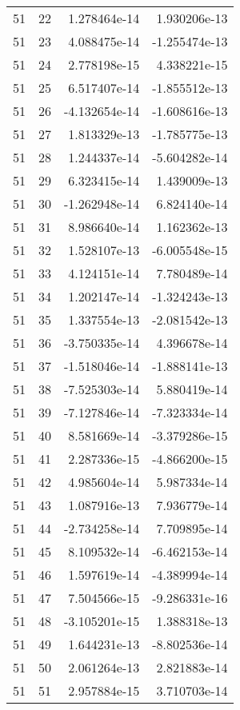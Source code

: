 \begin{tabular}{rrrr}
  51 &   22 &  1.278464e-14 &  1.930206e-13 \\
  51 &   23 &  4.088475e-14 & -1.255474e-13 \\
  51 &   24 &  2.778198e-15 &  4.338221e-15 \\
  51 &   25 &  6.517407e-14 & -1.855512e-13 \\
  51 &   26 & -4.132654e-14 & -1.608616e-13 \\
  51 &   27 &  1.813329e-13 & -1.785775e-13 \\
  51 &   28 &  1.244337e-14 & -5.604282e-14 \\
  51 &   29 &  6.323415e-14 &  1.439009e-13 \\
  51 &   30 & -1.262948e-14 &  6.824140e-14 \\
  51 &   31 &  8.986640e-14 &  1.162362e-13 \\
  51 &   32 &  1.528107e-13 & -6.005548e-15 \\
  51 &   33 &  4.124151e-14 &  7.780489e-14 \\
  51 &   34 &  1.202147e-14 & -1.324243e-13 \\
  51 &   35 &  1.337554e-13 & -2.081542e-13 \\
  51 &   36 & -3.750335e-14 &  4.396678e-14 \\
  51 &   37 & -1.518046e-14 & -1.888141e-13 \\
  51 &   38 & -7.525303e-14 &  5.880419e-14 \\
  51 &   39 & -7.127846e-14 & -7.323334e-14 \\
  51 &   40 &  8.581669e-14 & -3.379286e-15 \\
  51 &   41 &  2.287336e-15 & -4.866200e-15 \\
  51 &   42 &  4.985604e-14 &  5.987334e-14 \\
  51 &   43 &  1.087916e-13 &  7.936779e-14 \\
  51 &   44 & -2.734258e-14 &  7.709895e-14 \\
  51 &   45 &  8.109532e-14 & -6.462153e-14 \\
  51 &   46 &  1.597619e-14 & -4.389994e-14 \\
  51 &   47 &  7.504566e-15 & -9.286331e-16 \\
  51 &   48 & -3.105201e-15 &  1.388318e-13 \\
  51 &   49 &  1.644231e-13 & -8.802536e-14 \\
  51 &   50 &  2.061264e-13 &  2.821883e-14 \\
  51 &   51 &  2.957884e-15 &  3.710703e-14 \\

\end{tabular}
